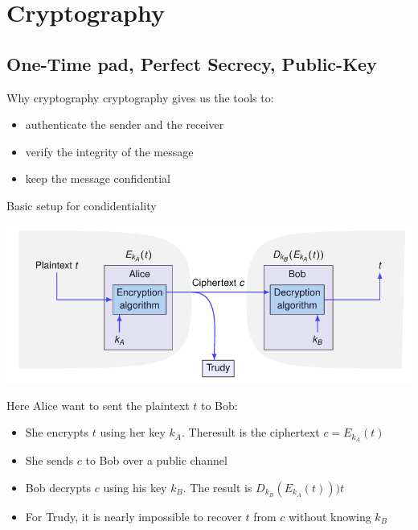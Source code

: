 
\chapter{Cryptography}
    \section{One-Time pad, Perfect Secrecy, Public-Key}
    

\begin{parag}{Why cryptography}
    cryptography gives us the tools to:
    \begin{itemize}
        \item authenticate the sender and the receiver
        \item verify the integrity of the message
        \item keep the message confidential
    \end{itemize}
\end{parag}
\begin{parag}{Basic setup for condidentiality}
    \begin{center}
        \includegraphics[scale=0.6]{12025-03-18.png}
    \end{center}
   Here Alice want to sent the plaintext $t$ to Bob:
   \begin{itemize}
       \item She encrypts $t$ using her key $k_A$. Theresult is the ciphertext $c = E_{k_A}(t)$
       \item She sends $c$ to Bob over a public channel
       \item Bob decrypts $c$ using his key $k_B$. The result is $D_{k_B}(E_{k_A}(t)) ) t$
       \item For Trudy, it is nearly impossible to recover $t$ from $c$ without knowing $k_B$
   \end{itemize}
\end{parag}
